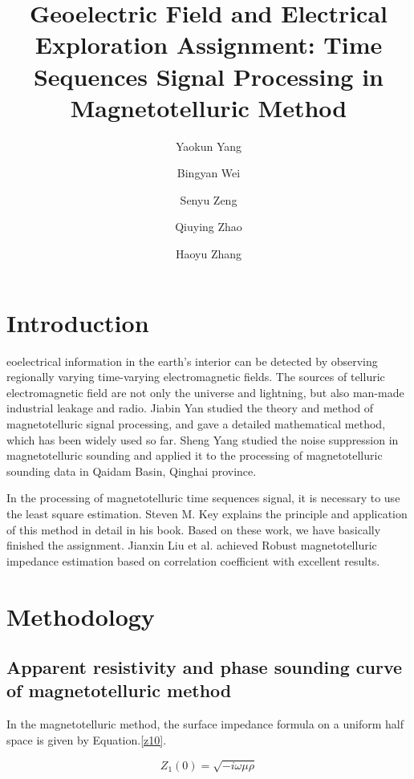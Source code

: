 \documentclass[9pt,a4paper,twoside]{rho-class/rho}
\title{Geoelectric Field and Electrical Exploration Assignment: Time Sequences Signal Processing in Magnetotelluric Method}
\author[1]{Yaokun Yang}
\author[1]{Bingyan Wei}
\author[1]{Senyu Zeng}
\author[1]{Qiuying Zhao}
\author[1]{Haoyu Zhang}
\affil[1]{Shcool of Geoscience and Info-physics, Central South University, Changsha 410083, China.}
\begin{document}
	
    \maketitle
    \thispagestyle{firststyle}
    \linenumbers


\section{Introduction}

eoelectrical information in the earth's interior can be detected by observing regionally varying time-varying electromagnetic fields. The sources of telluric electromagnetic field are not only the universe and lightning, but also man-made industrial leakage and radio. Jiabin Yan \cite{yan2004phd} studied the theory and method of magnetotelluric signal processing, and gave a detailed mathematical method, which has been widely used so far. Sheng Yang \cite{yang2004phd} studied the noise suppression in magnetotelluric sounding and applied it to the processing of magnetotelluric sounding data in Qaidam Basin, Qinghai province.

In the processing of magnetotelluric time sequences signal, it is necessary to use the least square estimation. Steven M. Key\cite{steven1993,steven1998} explains the principle and application of this method in detail in his book. Based on these work, we have basically finished the assignment. Jianxin Liu et al.\cite{liu2003} achieved Robust magnetotelluric impedance estimation based on correlation coefficient with excellent results.

\section{Methodology}

\subsection{Apparent resistivity and phase sounding curve of magnetotelluric method}

In the magnetotelluric method\cite{yan2024lectures}, the surface impedance formula on a uniform half space is given by Equation.\eqref{z10}. 

\begin{equation}
    \label{z10}
    Z_1(0)=\sqrt{-i\omega \mu\rho}
\end{equation}
\end{document}
